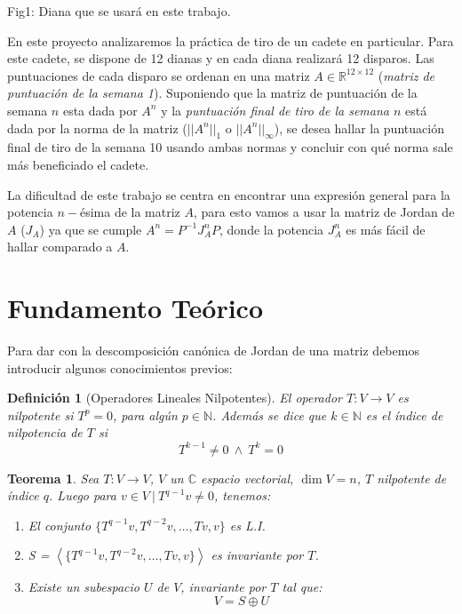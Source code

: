 \documentclass[12pt,a4paper]{article}
\newtheorem{mydef}{Definici\'on}[section]
\newtheorem{mytheo}{Teorema}[section]
\begin{document}
\begin{multicols}{2}
\begin{center}
Fig1: Diana que se usará en este trabajo.
\end{center}
\noindent En este proyecto analizaremos la práctica de tiro de un cadete en particular. Para este cadete, se dispone de 12 dianas  y en cada diana realizará 12 disparos. Las puntuaciones de cada disparo se ordenan en una matriz $A \in \mathbb{R}^{12\times 12}$ (\textit{matriz de puntuación de la semana 1}). Suponiendo que la matriz de puntuación de la semana $n$ esta dada por $A^n$ y la \textit{puntuación final de tiro de la semana $n$ }está dada por la norma de la matriz ($||A^n||_1\text{ o }||A^n||_\infty$), se desea hallar la puntuación final de tiro de la semana 10 usando ambas normas y concluir con qué norma sale más beneficiado el cadete.

\noindent La dificultad de este trabajo se centra en encontrar una expresión general para la potencia $n-$ésima de la matriz $A$, para esto vamos a usar la matriz de Jordan de $A$ ($J_A$) ya que se cumple $A^n=P^{-1}J^n_AP$, donde la potencia  $J^n_A$ es más fácil de hallar comparado a $A$.


\section{Fundamento Teórico}

\noindent Para dar con la descomposición canónica de Jordan de una matriz debemos introducir algunos conocimientos previos:

\begin{mydef}[Operadores Lineales Nilpotentes]
	El operador $T:V\to V$ es nilpotente si $T^{p} = 0$, para algún $p\in\mathbb{N}$. Además se dice que $k\in\mathbb{N}$ es el índice de nilpotencia de $T$ si $$T^{k-1}\neq 0 \ \wedge \ T^{k} = 0$$
\end{mydef}

\begin{mytheo}\label{theo_nilpotentes}  
    \noindent Sea $T:V\to V$, $V$ un $\mathbb{C}$ espacio vectorial, $\dim V = n$, $T$ nilpotente de índice $q$. Luego para $v\in V \ | \ T^{q-1}v\neq 0$, tenemos:
	\begin{enumerate}
		\item El conjunto $\{T^{q-1}v, T^{q-2}v,\ldots,Tv, v\}$ es L.I.
		\item S = $\left<\{T^{q-1}v, T^{q-2}v,\ldots,Tv, v\}\right>$ es invariante por $T$.
		\item Existe un subespacio $U$ de $V$, invariante por $T$ tal que:
		$$V = S\oplus U$$
	\end{enumerate}
\end{mytheo}


\end{multicols}
\end{document}
